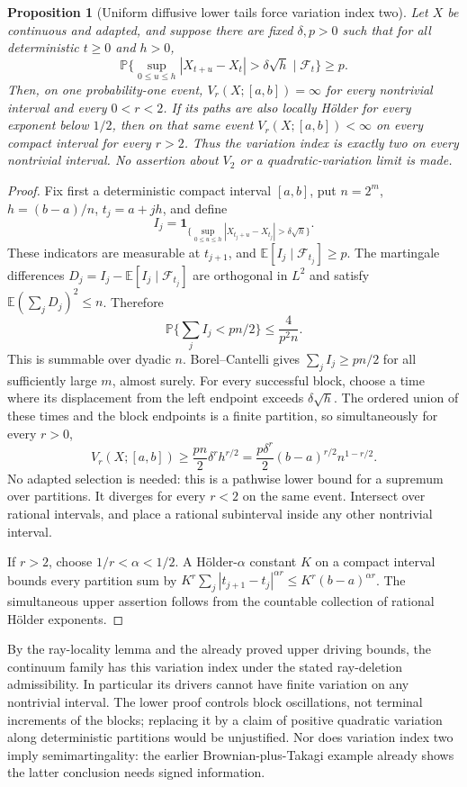 \documentclass[11pt]{article}
\newtheorem{proposition}[theorem]{Proposition}
\theoremstyle{definition}\newtheorem{definition}[theorem]{Definition}
\theoremstyle{remark}\newtheorem{remark}[theorem]{Remark}
\begin{document}
\begin{proposition}[Uniform diffusive lower tails force variation index two]
\label{prop:driver-variation-index}
Let $X$ be continuous and adapted, and suppose there are fixed
$\delta,p>0$ such that for all deterministic $t\ge0$ and $h>0$,
\[
 \mathbb P\{\sup_{0\le u\le h}|X_{t+u}-X_t|
                 >\delta\sqrt h\mid\mathcal F_t\}\ge p.
 \tag{VI2}
\]
Then, on one probability-one event, $V_r(X;[a,b])=\infty$ for
every nontrivial interval and every $0<r<2$. If its paths are also
locally H\"older for every exponent below $1/2$, then on that same
event $V_r(X;[a,b])<\infty$ on every compact interval for every
$r>2$. Thus the variation index is exactly two on every nontrivial
interval. No assertion about $V_2$ or a quadratic-variation limit
is made.
\end{proposition}
\begin{proof}
Fix first a deterministic compact interval $[a,b]$, put
$n=2^m$, $h=(b-a)/n$, $t_j=a+jh$, and define
\[
 I_j=\mathbf1_{\{\sup_{0\le u\le h}
                  |X_{t_j+u}-X_{t_j}|>\delta\sqrt h\}}.
\]
These indicators are measurable at $t_{j+1}$, and
$\mathbb E[I_j\mid\mathcal F_{t_j}]\ge p$.
The martingale differences
$D_j=I_j-\mathbb E[I_j\mid\mathcal F_{t_j}]$ are orthogonal in
$L^2$ and satisfy $\mathbb E(\sum_jD_j)^2\le n$. Therefore
\[
 \mathbb P\{\textstyle\sum_jI_j<pn/2\}
     \le\frac4{p^2n}.
 \tag{VI3}
\]
This is summable over dyadic $n$. Borel--Cantelli gives
$\sum_jI_j\ge pn/2$ for all sufficiently large $m$, almost surely.
For every successful block, choose a time where its displacement
from the left endpoint exceeds $\delta\sqrt h$. The ordered union
of these times and the block endpoints is a finite partition, so
simultaneously for every $r>0$,
\[
 V_r(X;[a,b])\ge\frac{pn}{2}\delta^r h^{r/2}
       =\frac{p\delta^r}{2}(b-a)^{r/2}n^{1-r/2}.
 \tag{VI4}
\]
No adapted selection is needed: this is a pathwise lower bound for a
supremum over partitions. It diverges for every $r<2$ on the same
event. Intersect over rational intervals, and place a rational
subinterval inside any other nontrivial interval.

If $r>2$, choose $1/r<\alpha<1/2$. A H\"older-$\alpha$ constant
$K$ on a compact interval bounds every partition sum by
$K^r\sum_j|t_{j+1}-t_j|^{\alpha r}\le K^r(b-a)^{\alpha r}$.
The simultaneous upper assertion follows from the countable collection
of rational H\"older exponents.
\end{proof}

By the ray-locality lemma and the already proved upper driving bounds,
the continuum family has this variation index under the stated
ray-deletion admissibility. In particular its drivers cannot have
finite variation on any nontrivial interval. The lower proof controls
block oscillations, not terminal increments of the blocks; replacing
it by a claim of positive quadratic variation along deterministic
partitions would be unjustified. Nor does variation index two imply
semimartingality: the earlier Brownian-plus-Takagi example already
shows the latter conclusion needs signed information.
\end{document}
